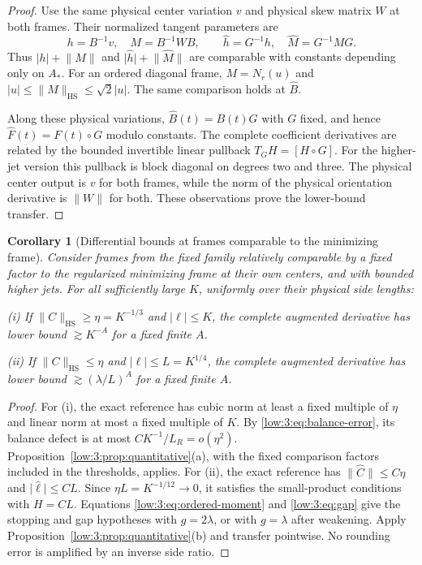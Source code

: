 \documentclass[11pt]{amsart}
\newtheorem{corollary}[theorem]{Corollary}
\theoremstyle{definition}
\theoremstyle{remark}
\newcommand{\norm}[1]{\lVert #1\rVert}
\newcommand{\abs}[1]{\lvert #1\rvert}
\numberwithin{equation}{section}
\begin{document}
\begin{proof}
Use the same physical center variation $v$ and physical skew matrix $W$ at both frames. Their normalized tangent parameters are
\[
h=B^{-1}v,\quad M=B^{-1}WB,\qquad \widehat h=G^{-1}h,\quad \widehat M=G^{-1}MG.
\]
Thus $\abs h+\norm M$ and $\abs{\widehat h}+\norm{\widehat M}$ are comparable with constants depending only on $A_*$. For an ordered diagonal frame, $M=N_r(u)$ and $\abs u\leq\norm M_{\mathrm{HS}}\leq\sqrt2\abs u$. The same comparison holds at $\widehat B$.

Along these physical variations, $\widehat B(t)=B(t)G$ with $G$ fixed, and hence $\widehat F(t)=F(t)\circ G$ modulo constants. The complete coefficient derivatives are related by the bounded invertible linear pullback $T_GH=[H\circ G]$. For the higher-jet version this pullback is block diagonal on degrees two and three. The physical center output is $v$ for both frames, while the norm of the physical orientation derivative is $\norm W$ for both. These observations prove the lower-bound transfer.
\end{proof}

\begin{corollary}[Differential bounds at frames comparable to the minimizing frame]\label{low:3:cor:eligible-differential}
Consider frames from the fixed family relatively comparable by a fixed factor to the regularized minimizing frame at their own centers, and with bounded higher jets. For all sufficiently large $K$, uniformly over their physical side lengths:

\smallskip\noindent
(i) If $\norm C_{\mathrm{HS}}\geq\eta=K^{-1/3}$ and $\abs\ell\leq K$, the complete augmented derivative has lower bound $\gtrsim K^{-A}$ for a fixed finite $A$.

\smallskip\noindent
(ii) If $\norm C_{\mathrm{HS}}\leq\eta$ and $\abs\ell\leq L=K^{1/4}$, the complete augmented derivative has lower bound $\gtrsim(\lambda/L)^A$ for a fixed finite $A$.
\end{corollary}

\begin{proof}
For (i), the exact reference has cubic norm at least a fixed multiple of $\eta$ and linear norm at most a fixed multiple of $K$. By \eqref{low:3:eq:balance-error}, its balance defect is at most $C K^{-1}/L_R=o(\eta^2)$. Proposition~\ref{low:3:prop:quantitative}(a), with the fixed comparison factors included in the thresholds, applies. For (ii), the exact reference has $\norm{\widehat C}\leq C\eta$ and $\abs{\widehat\ell}\leq CL$. Since $\eta L=K^{-1/12}\to0$, it satisfies the small-product conditions with $H=CL$. Equations \eqref{low:3:eq:ordered-moment} and \eqref{low:3:eq:gap} give the stopping and gap hypotheses with $g=2\lambda$, or with $g=\lambda$ after weakening. Apply Proposition~\ref{low:3:prop:quantitative}(b) and transfer pointwise. No rounding error is amplified by an inverse side ratio.
\end{proof}
\end{document}

